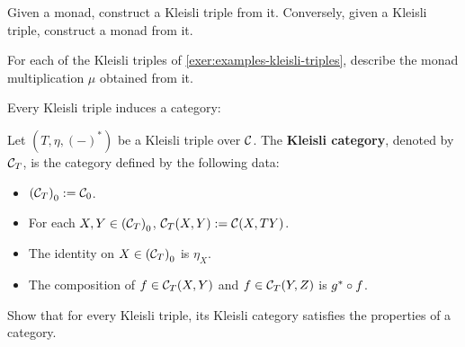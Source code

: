 \begin{exer} Given a monad, construct a Kleisli triple from it.
Conversely, given a Kleisli triple, construct a monad from it.
\end{exer}

\begin{exer}
  For each of the Kleisli triples of \cref{exer:examples-kleisli-triples}, describe the monad multiplication $\mu$ obtained from it.
\end{exer}

Every Kleisli triple induces a category:
\begin{dfn} Let $(T,\eta, (-)^{*})$ be a Kleisli triple over $\CC$. The \textbf{Kleisli category}, denoted by $\CC_{T}$, is the category defined by the following data:
\begin{itemize}
\item $\Ob{(\CC_T)} := \Ob{\CC}$.
\item For each $X,Y\in\Ob{(\CC_T)}$, $\CHom{\CC_T}{X}{Y} := \CHom{\CC}{X}{TY}$.
\item The identity on $X\in\Ob{(\CC_T)}$ is $\eta_X$.
\item The composition of $f\in \CHom{\CC_T}{X}{Y}$ and $f\in \CHom{\CC_T}{Y}{Z}$ is $\co{f}{g^{*}}$.
\end{itemize}
\end{dfn}

\begin{exer} Show that for every Kleisli triple, its Kleisli category satisfies the properties of a category.
\end{exer}


